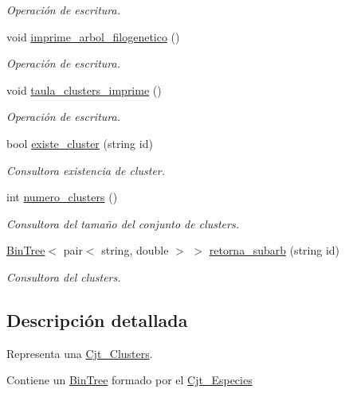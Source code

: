\begin{DoxyCompactItemize}
\begin{DoxyCompactList}\small\item\em Operación de escritura. \end{DoxyCompactList}\item 
void \hyperlink{class_cjt___clusters_a95262506a2fdc5455ce104fb84649ee9}{imprime\+\_\+arbol\+\_\+filogenetico} ()
\begin{DoxyCompactList}\small\item\em Operación de escritura. \end{DoxyCompactList}\item 
void \hyperlink{class_cjt___clusters_a6a261f0f5ca471e257d6b17e91b4887a}{taula\+\_\+clusters\+\_\+imprime} ()
\begin{DoxyCompactList}\small\item\em Operación de escritura. \end{DoxyCompactList}\item 
bool \hyperlink{class_cjt___clusters_a4fcda36a68e8fe48d787dfd14e9b222b}{existe\+\_\+cluster} (string id)
\begin{DoxyCompactList}\small\item\em Consultora existencia de cluster. \end{DoxyCompactList}\item 
int \hyperlink{class_cjt___clusters_ad00d2fe80f0b0dc1e593a91f8be6b761}{numero\+\_\+clusters} ()
\begin{DoxyCompactList}\small\item\em Consultora del tamaño del conjunto de clusters. \end{DoxyCompactList}\item 
\hyperlink{class_bin_tree}{Bin\+Tree}$<$ pair$<$ string, double $>$ $>$ \hyperlink{class_cjt___clusters_aca3506a7084d53e251ff052b0bbaf5bb}{retorna\+\_\+subarb} (string id)
\begin{DoxyCompactList}\small\item\em Consultora del clusters. \end{DoxyCompactList}\end{DoxyCompactItemize}


\subsection{Descripción detallada}
Representa una \hyperlink{class_cjt___clusters}{Cjt\+\_\+\+Clusters}. 

Contiene un \hyperlink{class_bin_tree}{Bin\+Tree} formado por el \hyperlink{class_cjt___especies}{Cjt\+\_\+\+Especies} 

